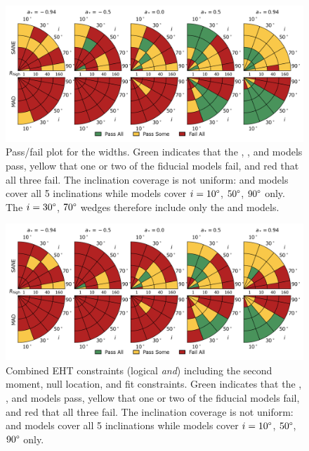 
\begin{figure}
 \centering
 \includegraphics[width=\textwidth]{./figures/Mring_w_Constraints.png}
  \caption{Pass/fail plot for the \mring widths.
    Green indicates that the \kharma, \bhac, and \hamr models pass, yellow that one or two of the fiducial models fail, and red that all three fail.
    The inclination coverage is not uniform: \bhac and \kharma models cover all 5 inclinations while \hamr models cover $i = 10\degree$, $50\degree$, $90\degree$ only.
    The $i = 30\degree$, $70\degree$ wedges therefore include only the \bhac and \kharma models.}
  \label{fig:mring_width_salsa} %
\end{figure}

\begin{figure}
  \centering
  \includegraphics[width=\textwidth]{./figures/Interferometric_Constraints.png}
  \caption{Combined EHT constraints (logical {\em and}) including the second moment, null location, and \mring fit constraints.
    Green indicates that the \kharma, \bhac, and \hamr models pass, yellow that one or two of the fiducial models fail, and red that all three fail.
    The inclination coverage is not uniform: \bhac and \kharma models cover all 5 inclinations while \hamr models cover $i = 10\degree$, $50\degree$, $90\degree$ only.}
  \label{fig:all_EHT_constraints} %
\end{figure}

